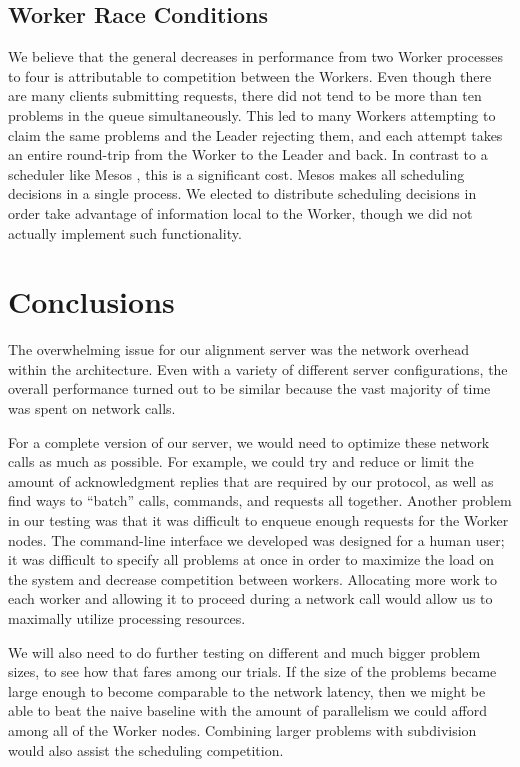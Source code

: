 \documentclass[12pt]{article}
\begin{document}
\subsection{Worker Race Conditions}
We believe that the general decreases in performance from two Worker processes to four is attributable to competition between the Workers.
Even though there are many clients submitting requests, there did not tend to be more than ten problems in the queue simultaneously.
This led to many Workers attempting to claim the same problems and the Leader rejecting them, and each attempt takes an entire round-trip from the Worker to the Leader and back.
In contrast to a scheduler like Mesos \cite{Mesos}, this is a significant cost.
Mesos makes all scheduling decisions in a single process.
We elected to distribute scheduling decisions in order take advantage of information local to the Worker, though we did not actually implement such functionality.



\section{Conclusions} 

The overwhelming issue for our alignment server was the network overhead within the architecture. Even with a variety of different server configurations, the overall performance turned out to be similar because the vast majority of time was spent on network calls. 

For a complete version of our server, we would need to optimize these network calls as much as possible.
For example, we could try and reduce or limit the amount of acknowledgment replies that are required by our protocol, as well as find ways to ``batch'' calls, commands, and requests all together.
Another problem in our testing was that it was difficult to enqueue enough requests for the Worker nodes.
The command-line interface we developed was designed for a human user; it was difficult to specify all problems at once in order to maximize the load on the system and decrease competition between workers.
Allocating more work to each worker and allowing it to proceed during a network call would allow us to maximally utilize processing resources.

We will also need to do further testing on different and much bigger problem sizes, to see how that fares among our trials. If the size of the problems became large enough to become comparable to the network latency, then we might be able to beat the naive baseline with the amount of parallelism we could afford among all of the Worker nodes.
Combining larger problems with subdivision would also assist the scheduling competition.
\end{document}
